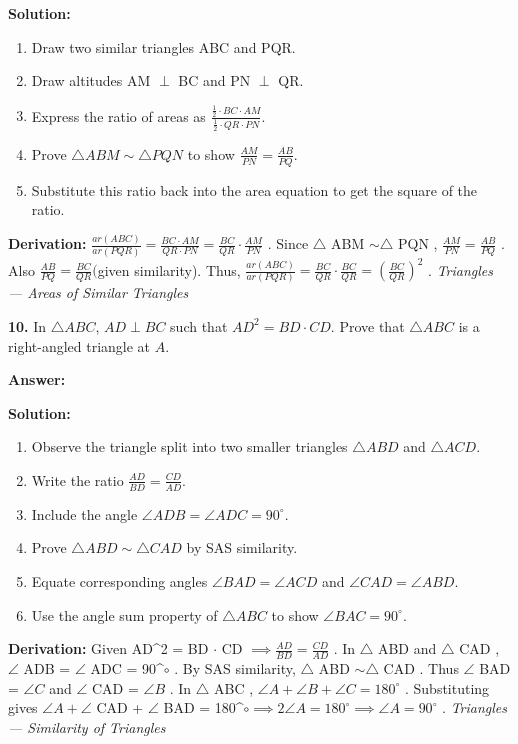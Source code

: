 \documentclass[12pt,a4paper]{exam}
\newcommand{\fitmath}[1]{%
  \sbox{\schmathbox}{$\displaystyle #1$}%
  \ifdim\wd\schmathbox>\linewidth
    \resizebox{\linewidth}{!}{\usebox{\schmathbox}}%
  \else
    \usebox{\schmathbox}%
  \fi}
\begin{document}
\begin{questions}
\textbf{Solution:}
\begin{enumerate}
  \item Draw two similar triangles ABC and PQR.
  \item Draw altitudes AM $\perp$ BC and PN $\perp$ QR.
  \item Express the ratio of areas as $\frac{\frac{1}{2} \cdot BC \cdot AM}{\frac{1}{2} \cdot QR \cdot PN}$.
  \item Prove $\triangle ABM \sim \triangle PQN$ to show $\frac{AM}{PN} = \frac{AB}{PQ}$.
  \item Substitute this ratio back into the area equation to get the square of the ratio.
\end{enumerate}
\textbf{Derivation:}
 $\frac{ar(ABC)}{ar(PQR)} = \frac{BC \cdot AM}{QR \cdot PN} = \frac{BC}{QR} \cdot \frac{AM}{PN}$ . Since  $\triangle$ ABM $\sim \triangle$ PQN ,  $\frac{AM}{PN} = \frac{AB}{PQ}$ . Also  $\frac{AB}{PQ} = \frac{BC}{QR}  ($given similarity). Thus,  $\frac{ar(ABC)}{ar(PQR)} = \frac{BC}{QR} \cdot \frac{BC}{QR} = (\frac{BC}{QR})^2$ .
\hfill \textit{Triangles — Areas of Similar Triangles}
\vspace{0.3cm}

\question \textbf{10.} In $\triangle ABC$, $AD \perp BC$ such that $AD^2 = BD \cdot CD$. Prove that $\triangle ABC$ is a right-angled triangle at $A$.

\textbf{Answer:}
\begin{center}
\fitmath{\angle BAC = 90^\circ}
\end{center}

\textbf{Solution:}
\begin{enumerate}
  \item Observe the triangle split into two smaller triangles $\triangle ABD$ and $\triangle ACD$.
  \item Write the ratio $\frac{AD}{BD} = \frac{CD}{AD}$.
  \item Include the angle $\angle ADB = \angle ADC = 90^\circ$.
  \item Prove $\triangle ABD \sim \triangle CAD$ by SAS similarity.
  \item Equate corresponding angles $\angle BAD = \angle ACD$ and $\angle CAD = \angle ABD$.
  \item Use the angle sum property of $\triangle ABC$ to show $\angle BAC = 90^\circ$.
\end{enumerate}
\textbf{Derivation:}
Given  AD\textasciicircum{}2 = BD $\cdot$ CD $\implies \frac{AD}{BD} = \frac{CD}{AD}$ . In  $\triangle$ ABD  and  $\triangle$ CAD ,  $\angle$ ADB = $\angle$ ADC = 90\textasciicircum{}$\circ$ . By SAS similarity,  $\triangle$ ABD $\sim \triangle$ CAD . Thus  $\angle$ BAD = $\angle C$  and  $\angle$ CAD = $\angle B$ . In  $\triangle$ ABC ,  $\angle A + \angle B + \angle C = 180^\circ$ . Substituting gives  $\angle A + \angle$ CAD + $\angle$ BAD = 180\textasciicircum{}$\circ \implies 2\angle A = 180^\circ \implies \angle A = 90^\circ$ .
\hfill \textit{Triangles — Similarity of Triangles}
\vspace{0.3cm}


\end{questions}
\end{document}
